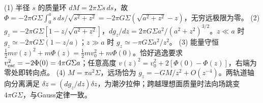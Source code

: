(1) 半径 \(s\) 的质量环 \(dM=2\pi\Sigma s\,ds\)，故 \(\Phi=-2\pi G\Sigma\int_0^a s\,ds/\sqrt{s^2+z^2}=-2\pi G\Sigma(\sqrt{a^2+z^2}-z)\)，无穷远极限为零。
(2) \(g_z=-2\pi G\Sigma[1-z/\sqrt{a^2+z^2}]\)，\(dg_z/dz=2\pi G\Sigma a^2/(a^2+z^2)^{3/2}\)。\(z\ll a\) 时 \(g_z\simeq-2\pi G\Sigma(1-z/a)\)；\(z\gg a\) 时 \(g_z\simeq-\pi G\Sigma a^2/z^2\)。
(3) 能量守恒 \(\frac12mv(z)^2+m\Phi(z)=\frac12mv_0^2+m\Phi(0)\)。恰好逃逸要求 \(v_{\rm esc}^2=-2\Phi(0)=4\pi G\Sigma a\)；任意高度 \(v(z)^2=v_0^2+2[\Phi(0)-\Phi(z)]\)，右端为零处即转向点。
(4) \(M=\pi a^2\Sigma\)，远场恰为 \(g_z=-GM/z^2+O(z^{-4})\)。两轨道轴向分离满足 \(\delta\ddot z=(dg_z/dz)\delta z\)，为潮汐拉伸；跨越理想面质量时法向场跳变 \(4\pi G\Sigma\)，与Gauss定律一致。

